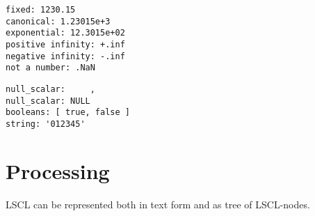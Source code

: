 \begin{lstlisting}[caption = floating point]
fixed: 1230.15
canonical: 1.23015e+3
exponential: 12.3015e+02
positive infinity: +.inf
negative infinity: -.inf
not a number: .NaN
\end{lstlisting}

\begin{lstlisting}[caption = miscellaneous]
null_scalar:     ,
null_scalar: NULL
booleans: [ true, false ]
string: '012345'
\end{lstlisting}





\section{Processing}
LSCL can be represented both in text form and as tree of LSCL-nodes. 




